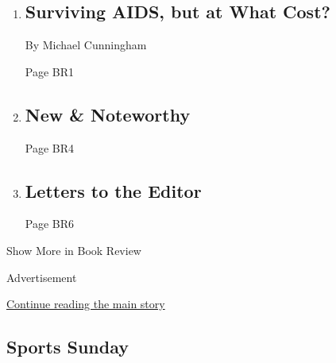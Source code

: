 \begin{enumerate}
\def\labelenumi{\arabic{enumi}.}
\item
  \href{/2018/06/25/books/review/rebecca-makkai-great-believers.html}{}

  \hypertarget{surviving-aids-but-at-what-cost}{%
  \subsection{Surviving AIDS, but at What
  Cost?}\label{surviving-aids-but-at-what-cost}}

  By Michael Cunningham

  Page BR1
\item
  \href{/2018/06/26/books/review/new-noteworthy-nandi-rodrigo.html}{}

  \hypertarget{new--noteworthy}{%
  \subsection{New \& Noteworthy}\label{new--noteworthy}}

  Page BR4
\item
  \href{/2018/06/29/books/review/letters-to-the-editor.html}{}

  \hypertarget{letters-to-the-editor}{%
  \subsection{Letters to the Editor}\label{letters-to-the-editor}}

  Page BR6
\end{enumerate}

Show More in Book Review

Advertisement

\protect\hyperlink{after-mid6}{Continue reading the main story}

\hypertarget{sports-sunday}{%
\subsection{Sports Sunday}\label{sports-sunday}}

